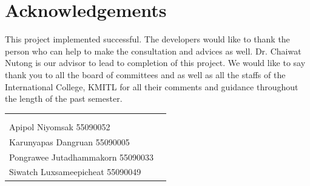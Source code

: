 \documentclass[11pt, oneside]{Thesis} %
\begin{document}
\clearpage %

\pagestyle{fancy}
\chapter{Acknowledgements}%
This project implemented successful. The developers would like to thank the person who can help to make the consultation and advices as well. Dr. Chaiwat Nutong is our advisor to lead to completion of this project.
We would like to say thank you to all the board of committees and as well as all the staffs of the International College, KMITL for all their comments and guidance throughout the length of the past semester.
\begin{flushright}
	\begin{tabular}{ll}
		\\
		\\
		\\
		Apipol Niyomsak 55090052 \\
		Karunyapas Dangruan 55090005 \\
		Pongrawee Jutadhammakorn 55090033 \\
		Siwatch Luxsameepicheat 55090049 \\
	\end{tabular}
	
\end{flushright}
\clearpage %

\pagestyle{fancy} %

\tableofcontents %

\listoffigures %
\end{document}
